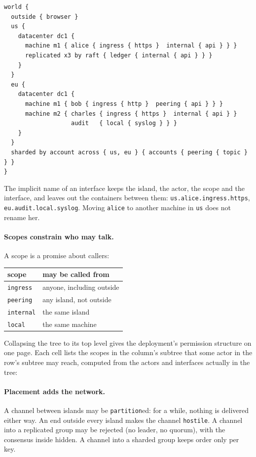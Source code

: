 \begin{lstlisting}[language={}]
world {
  outside { browser }
  us {
    datacenter dc1 {
      machine m1 { alice { ingress { https }  internal { api } } }
      replicated x3 by raft { ledger { internal { api } } }
    }
  }
  eu {
    datacenter dc1 {
      machine m1 { bob { ingress { http }  peering { api } } }
      machine m2 { charles { ingress { https }  internal { api } }
                   audit   { local { syslog } } }
    }
  }
  sharded by account across { us, eu } { accounts { peering { topic } } }
}
\end{lstlisting}

The implicit name of an interface keeps the island, the actor, the scope and the
interface, and leaves out the containers between them:
\texttt{us.alice.ingress.https}, \texttt{eu.audit.local.syslog}. Moving
\texttt{alice} to another machine in \texttt{us} does not rename her.

\paragraph{Scopes constrain who may talk.} A scope is a promise about callers:

\begin{center}
\small
\begin{tabular}{@{}ll@{}}
\toprule
scope & may be called from \\
\midrule
\texttt{ingress} & anyone, including outside \\
\texttt{peering} & any island, not outside \\
\texttt{internal} & the same island \\
\texttt{local} & the same machine \\
\bottomrule
\end{tabular}
\end{center}

Collapsing the tree to its top level gives the deployment's permission structure
on one page. Each cell lists the scopes in the column's subtree that some actor
in the row's subtree may reach, computed from the actors and interfaces actually
in the tree:

\begin{center}
\small

\end{center}

\paragraph{Placement adds the network.} A channel between islands may be
\texttt{partition}ed: for a while, nothing is delivered either way. An end
outside every island makes the channel \texttt{hostile}. A channel into a
replicated group may be rejected (no leader, no quorum), with the consensus
inside hidden. A channel into a sharded group keeps order only per key.

